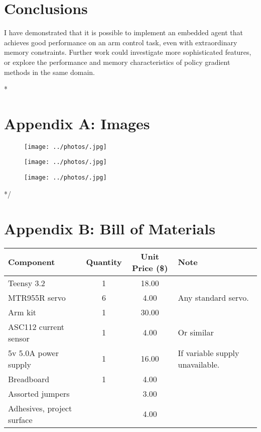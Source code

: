 \documentclass{article}
\begin{document}
\section{Conclusions}

I have demonstrated that it is possible to implement an embedded agent that achieves good performance on an arm control task, even with extraordinary memory constraints. Further work could investigate more sophisticated features, or explore the performance and memory characteristics of policy gradient methods in the same domain.

\clearpage

\/*
\section{Appendix A: Images}

	\begin{figure}[!htb]
		\centering
		\texttt{[image: ../photos/.jpg]}
		\label{fig:}
	\end{figure}
	
	\begin{figure}[!htb]
		\centering
		\texttt{[image: ../photos/.jpg]}
		\caption{}
		\label{fig:}
	\end{figure}
	
	\begin{figure}[!htb]
		\centering
		\texttt{[image: ../photos/.jpg]}
		\caption{}
		\label{fig:}
	\end{figure}
*/

\section{Appendix B: Bill of Materials}


\begin{center}
	\begin{tabular}{ l c c  p{5cm} }
		\toprule
		Component & Quantity & Unit Price (\$) & Note \\ \midrule
		Teensy 3.2 & 1 & 18.00 &  \\ 
		MTR955R servo & 6 & 4.00 & Any standard servo.\\ 
		Arm kit & 1 & 30.00 & \\
		ASC112 current sensor & 1 & 4.00 & Or similar\\
		5v 5.0A power supply & 1 & 16.00 & If variable supply unavailable. \\ 
		Breadboard & 1 & 4.00 & \\
		Assorted jumpers & & 3.00 & \\
		Adhesives, project surface & & 4.00 & \\
		\bottomrule
		
	\end{tabular}
\end{center}
	
\end{document}
